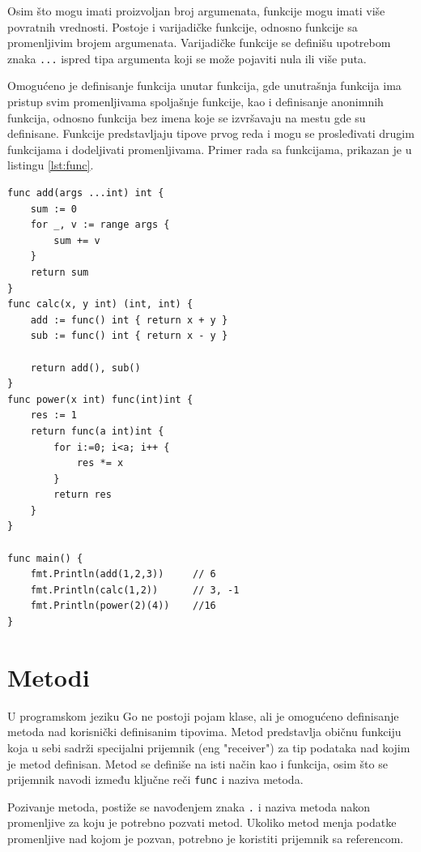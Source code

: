 \documentclass[12pt,oneside]{memoir}
\begin{document}
 Osim što mogu imati proizvoljan broj argumenata, funkcije mogu imati više povratnih vrednosti. Postoje i varijadičke funkcije, odnosno funkcije sa promenljivim brojem argumenata. Varijadičke funkcije se definišu upotrebom znaka \texttt{...} ispred tipa argumenta koji se može pojaviti nula ili više puta. 

Omogućeno je definisanje funkcija unutar funkcija, gde unutrašnja funkcija ima pristup svim promenljivama spoljašnje funkcije, kao i  definisanje anonimnih funkcija, odnosno funkcija bez imena koje se izvršavaju na mestu gde su definisane. Funkcije predstavljaju tipove prvog reda i mogu se prosleđivati drugim funkcijama i dodeljivati promenljivama. Primer rada sa funkcijama, prikazan je u listingu \ref{lst:func}.

\begin{center}
\begin{lstlisting}[caption=Primer koji demonstrira rad sa funkcijama, label={lst:func},  backgroundcolor=\color{background}]
func add(args ...int) int {
	sum := 0
	for _, v := range args {
		sum += v
	}
	return sum
}
func calc(x, y int) (int, int) {
	add := func() int { return x + y }
	sub := func() int { return x - y }

	return add(), sub()
}	
func power(x int) func(int)int {
	res := 1
	return func(a int)int {
		for i:=0; i<a; i++ {
			res *= x
		}
		return res
	}
}

func main() {
	fmt.Println(add(1,2,3))		// 6
	fmt.Println(calc(1,2)) 		// 3, -1
	fmt.Println(power(2)(4))	//16
}
\end{lstlisting}
\end{center}

\section{Metodi}  \label{metod}

U programskom jeziku Go ne postoji pojam klase, ali je omogućeno definisanje metoda nad korisnički definisanim tipovima. Metod predstavlja običnu funkciju koja u sebi sadrži specijalni prijemnik (eng "receiver") za tip podataka nad kojim je metod definisan. Metod se definiše na isti način kao i funkcija, osim što se prijemnik navodi između ključne reči \texttt{func} i naziva metoda.

Pozivanje metoda, postiže se navođenjem znaka \texttt{.} i naziva metoda nakon promenljive za koju je potrebno pozvati metod. Ukoliko metod menja podatke promenljive nad kojom je pozvan, potrebno je koristiti prijemnik sa referencom. 
 
\end{document}
